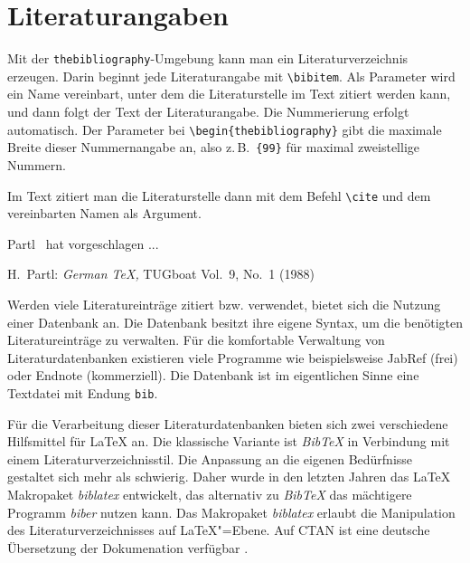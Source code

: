 
\section{Literaturangaben}

Mit der \texttt{thebibliography}-Umgebung kann man ein
Literaturverzeichnis erzeugen.
Darin beginnt jede Literaturangabe mit \lstinline|\bibitem|.
Als Parameter wird ein Name vereinbart, unter dem die
Literaturstelle im Text zitiert werden kann, und
dann folgt der Text der Literaturangabe.
Die Nummerierung erfolgt automatisch.
Der Parameter bei \lstinline|\begin{thebibliography}| gibt die
maximale Breite dieser Nummernangabe an, also z.\,B.\
\lstinline|{99}| für maximal zweistellige Nummern.

Im Text zitiert man die Literaturstelle dann mit dem Befehl \lstinline|\cite|
und dem vereinbarten Namen als Argument.

\let\origcite\cite
\begin{LTXexample}[preset=\let\cite\origcite]
Partl~\cite{pa} hat
vorgeschlagen ...

\begin{thebibliography}{99}
H.~Partl: \textit{German \TeX,}
TUGboat Vol.~9, No.~1 (1988)
\end{thebibliography}
\end{LTXexample}

Werden viele Literatureinträge zitiert bzw. verwendet, bietet sich die Nutzung
einer Datenbank an. Die Datenbank besitzt ihre eigene Syntax,
um die benötigten Literatureinträge zu verwalten. Für die komfortable Verwaltung
von Literaturdatenbanken existieren viele Programme wie beispielsweise JabRef (frei) oder
Endnote (kommerziell). Die Datenbank ist im eigentlichen Sinne eine Textdatei mit
Endung \lstinline|bib|.


Für die Verarbeitung dieser Literaturdatenbanken bieten sich zwei verschiedene
Hilfsmittel für \LaTeX{} an. Die klassische Variante ist \emph{Bib\TeX} in Verbindung
mit einem Literaturverzeichnisstil. Die Anpassung an die eigenen Bedürfnisse
gestaltet sich mehr als schwierig. Daher wurde in den letzten Jahren das \LaTeX{}
Makropaket \emph{biblatex} entwickelt, das alternativ zu \emph{Bib\TeX} das mächtigere
Programm \emph{biber} nutzen kann. Das Makropaket \emph{biblatex} erlaubt die Manipulation
des Literaturverzeichnisses auf \LaTeX"=Ebene. Auf CTAN ist eine deutsche Übersetzung der Dokumenation
verfügbar \cite{biblatex-de}.